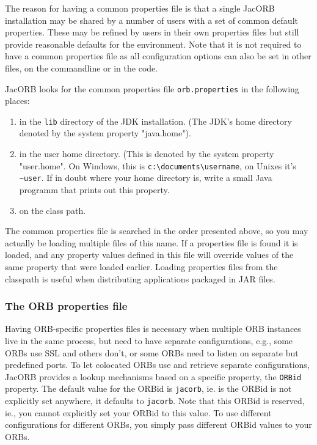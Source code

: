 The reason for having a common properties file is that a single JacORB
installation may be shared by a number of users with a set of common
default properties. These may be refined by users in their own
properties files but still provide reasonable defaults for the
environment. Note that it is not required to have a common properties
file as all configuration options can also be set in other files, on
the commandline or in the code.

JacORB looks for the common properties file {\tt orb.properties} in
the following places:

\begin{enumerate}
\item in the {\tt lib} directory of the JDK installation. (The JDK's
  home directory denoted by the system property "java.home").
\item in the user home directory. (This is denoted by the system
    property "user.home". On Windows, this is
    {\verb+c:\documents\username+}, on Unixes it's {\verb+~user+}. If
    in doubt where your home directory is, write a small Java programm that
  prints out this property.
\item on the class path.
\end{enumerate}

The common properties file is searched in the order presented above,
so you may actually be loading multiple files of this name. If a
properties file is found it is loaded, and any property values defined
in this file will override values of the same property that were
loaded earlier. Loading properties files from the classpath is useful
when distributing applications packaged in JAR files.

\subsubsection{The ORB properties file}

Having ORB-specific properties files is necessary when multiple ORB
instances live in the same process, but need to have separate
configurations, e.g., some ORBs use SSL and others don't, or some ORBs
need to listen on separate but predefined ports. To let colocated ORBs
use and retrieve separate configurations, JacORB provides a lookup
mechanisms based on a specific property, the {\tt ORBid} property. The
default value for the ORBid is {\tt jacorb}, ie. is the ORBid is not
explicitly set anywhere, it defaults to {\tt jacorb}. Note that this
ORBid is reserved, ie., you cannot explicitly set your ORBid to this
value. To use different configurations for different ORBs, you simply
pass different ORBid values to your ORBs.

